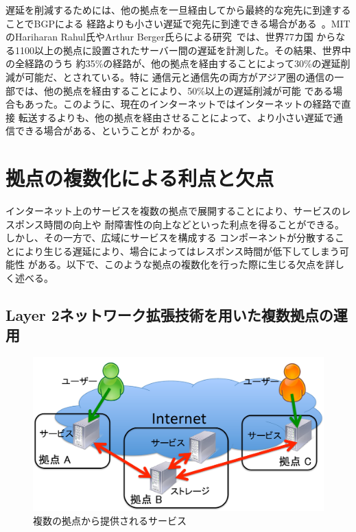 遅延を削減するためには、他の拠点を一旦経由してから最終的な宛先に到達することでBGPによる
経路よりも小さい遅延で宛先に到達できる場合がある~\cite{netvirt}。MITのHariharan Rahul氏やArthur Berger氏らによる研究~\cite{mittech}では、世界77カ国
からなる1100以上の拠点に設置されたサーバー間の遅延を計測した。その結果、世界中の全経路のうち
約35\%の経路が、他の拠点を経由することによって30\%の遅延削減が可能だ、とされている。特に
通信元と通信先の両方がアジア圏の通信の一部では、他の拠点を経由することにより、50\%以上の遅延削減が可能
である場合もあった。このように、現在のインターネットではインターネットの経路で直接
転送するよりも、他の拠点を経由させることによって、より小さい遅延で通信できる場合がある、ということが
わかる。

\section{拠点の複数化による利点と欠点}
\label{background:ml3}

インターネット上のサービスを複数の拠点で展開することにより、サービスのレスポンス時間の向上や
耐障害性の向上などといった利点を得ることができる。しかし、その一方で、広域にサービスを構成する
コンポーネントが分散することにより生じる遅延により、場合によってはレスポンス時間が低下してしまう可能性
がある。以下で、このような拠点の複数化を行った際に生じる欠点を詳しく述べる。

\subsection{Layer 2ネットワーク拡張技術を用いた複数拠点の運用}
\label{backgound:ml31}

\begin{figure}
	\begin{center}
		\includegraphics[scale=0.50]{./img/serviceanduser}
		\caption{複数の拠点から提供されるサービス}
		\label{img:mlservice}
	\end{center}
\end{figure}

